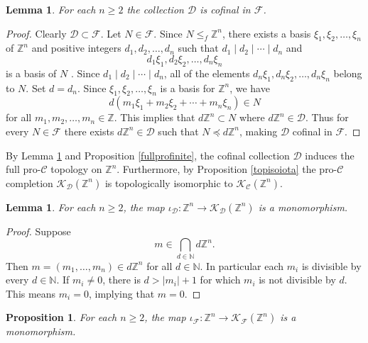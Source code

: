 \documentclass{amsart}
\theoremstyle{plain}
\newtheorem{lemma}[theorem]{Lemma}
\newtheorem{proposition}[theorem]{Proposition}
\theoremstyle{definition}
\theoremstyle{remark}
\begin{document}
\begin{lemma}\label{kproduct} For each $n\geq 2$ the collection ${\mathcal D}$ is cofinal in ${\mathcal F}$.
\end{lemma}

\begin{proof} Clearly ${\mathcal D}\subset {\mathcal F}$. Let $N\in {\mathcal F}$. Since $N\leq_f {\mathbb Z}^n$, there exists a basis $\xi_1,\xi_2,\dots,\xi_n$ of ${\mathbb Z}^n$ and positive integers $d_1,d_2,\dots,d_n$ such that $d_1 \mid d_2 \mid \cdots \mid d_n$ and 
\[d_1\xi_1, d_2\xi_2,\dots, d_n\xi_n\]
is a basis of $N$ . Since $d_1\mid d_2\mid \cdots\mid d_n$, all of the elements $d_n\xi_1,d_n\xi_2,\dots,d_n\xi_n$ belong to $N$. Set $d=d_n$. Since $\xi_1,\xi_2,\dots,\xi_n$ is a basis for ${\mathbb Z}^n$, we have
\[ d(m_1\xi_1+m_2\xi_2+\cdots+m_n\xi_n)\in N\]
for all $m_1,m_2,\dots,m_n\in{\mathbb Z}$. This implies that $d{\mathbb Z}^n \subset N$ where $d{\mathbb Z}^n \in {\mathcal D}$. Thus for every $N\in {\mathcal F}$ there exists $d{\mathbb Z}^n\in {\mathcal D}$ such that $N\preceq d{\mathbb Z}^n$, making ${\mathcal D}$ cofinal in ${\mathcal F}$.
\end{proof}
 
By Lemma \ref{kproduct} and Proposition \ref{fullprofinite}, the cofinal collection ${\mathcal D}$ induces the full pro-${\mathcal C}$ topology on ${\mathbb Z}^n$. Furthermore, by Proposition \ref{topisoiota} the pro-${\mathcal C}$ completion ${\mathcal K}_{\mathcal D}({\mathbb Z}^n)$ is topologically isomorphic to ${\mathcal K}_{\mathcal C}({\mathbb Z}^n)$.

\begin{lemma}\label{residualD} For each $n\geq 2$, the map $\iota_{{\mathcal D}}:{\mathbb Z}^n \to {\mathcal K}_{ {\mathcal D}}({\mathbb Z}^n)$ is a monomorphism.
\end{lemma}

\begin{proof} Suppose
\[ m \in \bigcap_{d\in{\mathbb N}} d{\mathbb Z}^n.\]
Then $m = (m_1,\dots,m_n) \in d{\mathbb Z}^n$ for all $d\in{\mathbb N}$. In particular each $m_i$ is divisible by every $d\in{\mathbb N}$. If $m_i\ne 0$, there is $d > \vert m_i\vert + 1$ for which $m_i$ is not divisible by $d$. This means $m_i=0$, implying that $m=0$.
\end{proof}

\begin{proposition}\label{residual} For each $n\geq 2$, the map $\iota_{{\mathcal F}}:{\mathbb Z}^n \to {\mathcal K}_{{\mathcal F}}({\mathbb Z}^n)$ is a monomorphism.
\end{proposition}
\end{document}
